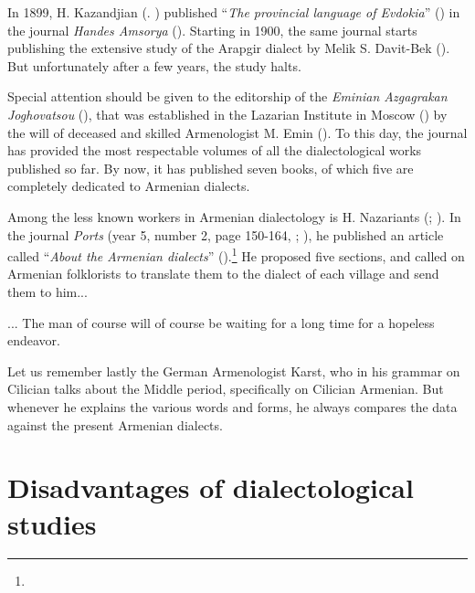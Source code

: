 In 1899, H. Kazandjian (. \citealt{KazandjianBook}) published ``\textit{The provincial language of Evdokia}'' () in the journal \textit{Handes Amsorya} (). Starting in 1900, the same journal starts publishing the extensive study of the Arapgir dialect by Melik S. Davit-Bek (). But unfortunately after a few years, the study halts. 

Special attention should be given to the editorship of the \textit{Eminian Azgagrakan Joghovatsou} (), that was established in the Lazarian Institute in Moscow () by the will of deceased and skilled Armenologist M. Emin (). To this day, the journal has provided the most respectable volumes of all the dialectological works published so far. By now, it has published seven books, of which five are completely dedicated to Armenian dialects. 

Among the less known workers in Armenian dialectology is H. Nazariants (; ). In the journal \textit{Ports} (year 5, number 2, page 150-164, ; ), he published an article called ``\textit{About the Armenian dialects}'' ().\footnote{} He proposed five sections, and called on Armenian folklorists to translate them to the dialect of each village and send them to him... 

\begin{adjarianpage}\label{page:4}\end{adjarianpage}%

... The man of course will of course be waiting for a long time for a hopeless endeavor. 

Let us remember lastly the German Armenologist Karst, who in his grammar on Cilician \citep{Karst-1901-MiddleArmenain} talks about the Middle period, specifically on Cilician Armenian. But whenever he explains the various words and forms, he always compares the data against the present Armenian dialects. 

\section{Disadvantages of dialectological studies}

